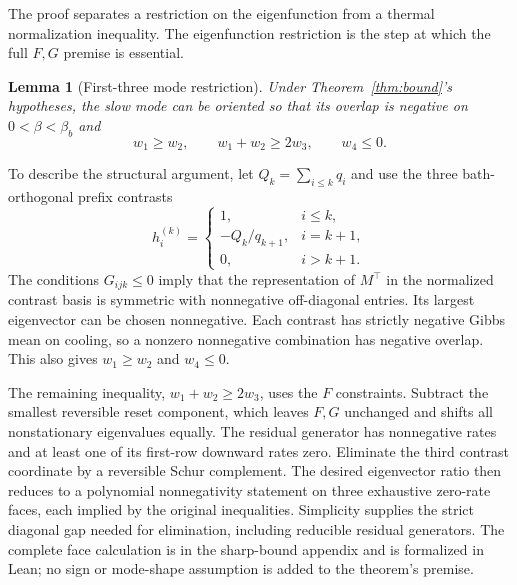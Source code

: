 \documentclass[11pt]{article}
\newtheorem{lemma}{Lemma}
\begin{document}
The proof separates a restriction on the eigenfunction from a thermal
normalization inequality. The eigenfunction restriction is the step at
which the full $F,G$ premise is essential.

\begin{lemma}[First-three mode restriction]\label{lem:shape}
Under Theorem~\ref{thm:bound}'s hypotheses, the slow mode can be oriented
so that its overlap is negative on $0<\beta<\beta_b$ and
\begin{equation}\label{eq:shape}
 w_1\geq w_2,\qquad w_1+w_2\geq2w_3,\qquad w_4\leq0.
\end{equation}
\end{lemma}
To describe the structural argument, let $Q_k=\sum_{i\leq k}q_i$ and
use the three bath-orthogonal prefix contrasts
\[
 h^{(k)}_i=\begin{cases}
 1,&i\leq k,\\-Q_k/q_{k+1},&i=k+1,\\0,&i>k+1.
 \end{cases}
\]
The conditions $G_{ijk}\leq0$ imply that the representation of $M^\top$
in the normalized contrast basis is symmetric with nonnegative
off-diagonal entries. Its largest eigenvector can be chosen nonnegative.
Each contrast has strictly negative Gibbs mean on cooling, so a nonzero
nonnegative combination has negative overlap. This also gives
$w_1\geq w_2$ and $w_4\leq0$.

The remaining inequality, $w_1+w_2\geq2w_3$, uses the $F$ constraints.
Subtract the smallest reversible reset component, which leaves $F,G$
unchanged and shifts all nonstationary eigenvalues equally. The residual
generator has nonnegative rates and at least one of its first-row
downward rates zero. Eliminate the third contrast coordinate by a
reversible Schur complement. The desired eigenvector ratio then reduces
to a polynomial nonnegativity statement on three exhaustive zero-rate
faces, each implied by the original inequalities. Simplicity supplies the
strict diagonal gap needed for elimination, including reducible residual
generators. The complete face calculation is in the sharp-bound appendix
and is formalized in Lean; no sign or mode-shape assumption is added to
the theorem's premise.
\end{document}
